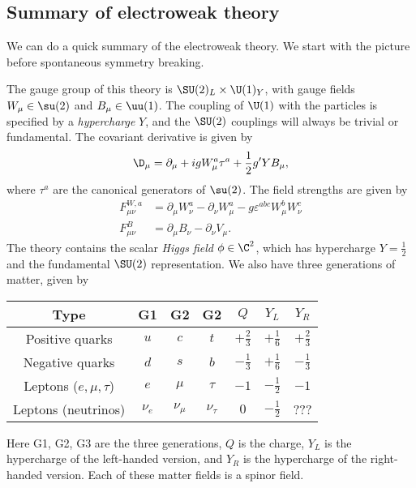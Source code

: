 \documentclass[a4paper]{article}
\begin{document}
\subsection{Summary of electroweak theory}
We can do a quick summary of the electroweak theory. We start with the picture before spontaneous symmetry breaking.

The gauge group of this theory is $\SU(2)_L \times \U(1)_Y$, with gauge fields $W_\mu \in \su(2)$ and $B_\mu \in \uu(1)$. The coupling of $\U(1)$ with the particles is specified by a \emph{hypercharge} $Y$, and the $\SU(2)$ couplings will always be trivial or fundamental. The covariant derivative is given by
\[
  \D_\mu = \partial_\mu + i g W_\mu^a \tau^a + \frac{1}{2} g' Y B_\mu,
\]
where $\tau^a$ are the canonical generators of $\su(2)$. The field strengths are given by
\begin{align*}
  F_{\mu\nu}^{W, a} &= \partial_\mu W_\nu^a - \partial_\nu W_\mu^a - g \varepsilon^{abc} W_\mu^b W_\nu^c\\
  F_{\mu\nu}^B &= \partial_\mu B_\nu - \partial_\nu V_\mu.
\end{align*}
The theory contains the scalar \emph{Higgs field} $\phi \in \C^2$, which has hypercharge $Y = \frac{1}{2}$ and the fundamental $\SU(2)$ representation. We also have three generations of matter, given by
\begin{center}
  \begin{tabular}{ccccccc}
    \toprule
    Type & G1 & G2 & G2 & $Q$ & $Y_L$ & $Y_R$\\
    \midrule
    Positive quarks & $u$ & $c$ & $t$ & $+\frac{2}{3}$ & $+\frac{1}{6}$ & $+\frac{2}{3}$ \\
    Negative quarks & $d$ & $s$ & $b$ & $-\frac{1}{3}$ & $+\frac{1}{6}$ & $-\frac{1}{3}$\\
    \midrule
    Leptons ($e, \mu, \tau$) & $e$ & $\mu$ & $\tau$ & $-1$ & $-\frac{1}{2}$ & $-1$\\
    Leptons (neutrinos) & $\nu_e$ & $\nu_\mu$ & $\nu_\tau$ & $0$ & $-\frac{1}{2}$ & ???\\
    \bottomrule
  \end{tabular}
\end{center}
Here G1, G2, G3 are the three generations, $Q$ is the charge, $Y_L$ is the hypercharge of the left-handed version, and $Y_R$ is the hypercharge of the right-handed version. Each of these matter fields is a spinor field.
\end{document}
